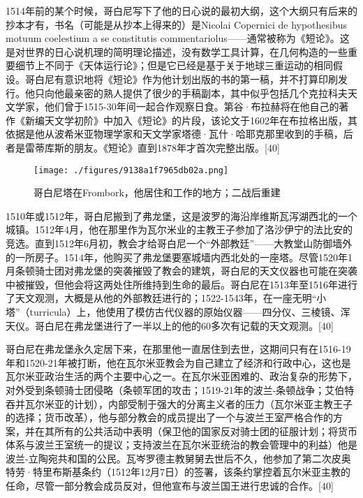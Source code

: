1514年前的某个时候，哥白尼写下了他的日心说的最初大纲，这个大纲只有后来的抄本才有，书名（可能是从抄本上得来的）是Nicolai Copernici de hypothesibus motuum coelestium a se constitutis commentariolus——通常被称为《短论》。这是对世界的日心说机理的简明理论描述，没有数学工具计算，在几何构造的一些重要细节上不同于《天体运行论》；但是它已经是基于关于地球三重运动的相同假设。哥白尼有意识地将《短论》作为他计划出版的书的第一稿，并不打算印刷发行。他只向他最亲密的熟人提供了很少的手稿副本，其中似乎包括几个克拉科夫天文学家，他们曾于1515-30年间一起合作观察日食。第谷·布拉赫将在他自己的著作《新编天文学初阶》中加入《短论》的片段，该论文于1602年在布拉格出版，其依据是他从波希米亚物理学家和天文学家塔德·瓦什·哈耶克那里收到的手稿，后者是雷蒂库斯的朋友。《短论》直到1878年才首次完整出版。[40]
\begin{figure}[ht]
\centering
\texttt{[image: ./figures/9138a1f7965db02a.png]}
\caption{哥白尼塔在Frombork，他居住和工作的地方；二战后重建} \label{fig_GBN_12}
\end{figure}
1510年或1512年，哥白尼搬到了弗龙堡，这是波罗的海沿岸维斯瓦泻湖西北的一个城镇。1512年4月，他在那里作为瓦尔米业的主教王子参加了洛沙伊宁的法比安的竞选。直到1512年6月初，教会才给哥白尼一个“外部教廷”——大教堂山防御墙外的一所房子。1514年，他购买了弗龙堡要塞城墙内西北处的一座塔。尽管1520年1月条顿骑士团对弗龙堡的突袭摧毁了教会的建筑，哥白尼的天文仪器也可能在突袭中被摧毁，但他会将这两处住所维持到生命的最后。哥白尼在1513年至1516年进行了天文观测，大概是从他的外部教廷进行的；1522-1543年，在一座无明“小塔”（turricula）上，他使用了模仿古代仪器的原始仪器——四分仪、三棱镜、浑天仪。哥白尼在弗龙堡进行了一半以上的他的60多次有记载的天文观测。[40]

哥白尼在弗龙堡永久定居下来，在那里他一直居住到去世，这期间只有在1516-19年和1520-21年被打断，他在瓦尔米亚教会为自己建立了经济和行政中心，这也是瓦尔米亚政治生活的两个主要中心之一。在瓦尔米亚困难的、政治复杂的形势下，对外受到条顿骑士团侵略（条顿军团的攻击；1519-21年的波兰-条顿战争；艾伯特吞并瓦尔米亚的计划），内部受制于强大的分离主义者的压力（瓦尔米亚主教王子的选择；货币改革），他与部分教会的成员提出了一个与波兰王室严格合作的方案，并在其所有的公共活动中表明（保卫他的国家反对骑士团的征服计划；将货币体系与波兰王室统一的提议；支持波兰在瓦尔米亚统治的教会管理中的利益）他是波兰-立陶宛共和国的公民。瓦岑罗德主教舅舅去世后不久，他参加了第二次皮奥特劳·特里布斯基条约（1512年12月7日）的签署，该条约掌控着瓦尔米亚主教的任命，尽管一部分教会成员反对，但他宣布与波兰国王进行忠诚的合作。[40]
